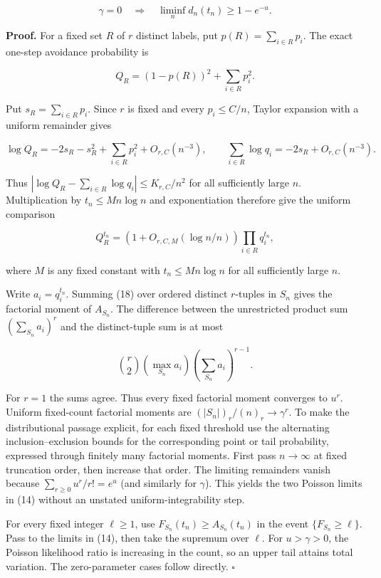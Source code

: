 \documentclass[
  british,
  11pt,
]{article}
\begin{document}
\[\gamma=0\quad\Longrightarrow\quad
\liminf_n d_n(t_n)\ge1-e^{-u}. \tag{16}\]

\textbf{Proof.} For a fixed set \(R\) of \(r\) distinct labels, put
\(p(R)=\sum_{i\in R}p_i\). The exact one-step avoidance probability is

\[Q_R=(1-p(R))^2+\sum_{i\in R}p_i^2. \tag{17}\]

Put \(s_R=\sum_{i\in R}p_i\). Since \(r\) is fixed and every
\(p_i\le C/n\), Taylor expansion with a uniform remainder gives

\[
\log Q_R=-2s_R-s_R^2+\sum_{i\in R}p_i^2+O_{r,C}(n^{-3}),
\qquad
\sum_{i\in R}\log q_i=-2s_R+O_{r,C}(n^{-3}).
\]

Thus \(|\log Q_R-\sum_{i\in R}\log q_i|\le K_{r,C}/n^2\) for all
sufficiently large \(n\). Multiplication by \(t_n\le Mn\log n\) and
exponentiation therefore give the uniform comparison

\[
Q_R^{t_n}=
\left(1+O_{r,C,M}(\log n/n)\right)\prod_{i\in R}q_i^{t_n}, \tag{18}
\]

where \(M\) is any fixed constant with \(t_n\le Mn\log n\) for all
sufficiently large \(n\).

Write \(a_i=q_i^{t_n}\). Summing (18) over ordered distinct \(r\)-tuples
in \(S_n\) gives the factorial moment of \(A_{S_n}\). The difference
between the unrestricted product sum \((\sum_{S_n}a_i)^r\) and the
distinct-tuple sum is at most

\[\binom r2\left(\max_{S_n}a_i\right)\left(\sum_{S_n}a_i\right)^{r-1}.\]

For \(r=1\) the sums agree. Thus every fixed factorial moment converges
to \(u^r\). Uniform fixed-count factorial moments are
\((|S_n|)_r/(n)_r\to\gamma^r\). To make the distributional passage
explicit, for each fixed threshold use the alternating
inclusion--exclusion bounds for the corresponding point or tail
probability, expressed through finitely many factorial moments. First
pass \(n\to\infty\) at fixed truncation order, then increase that order.
The limiting remainders vanish because \(\sum_{r\ge0}u^r/r!=e^u\) (and
similarly for \(\gamma\)). This yields the two Poisson limits in (14)
without an unstated uniform-integrability step.

For every fixed integer \(\ell\ge1\), use
\(F_{S_n}(t_n)\ge A_{S_n}(t_n)\) in the event \(\{F_{S_n}\ge\ell\}\).
Pass to the limits in (14), then take the supremum over \(\ell\). For
\(u>\gamma>0\), the Poisson likelihood ratio is increasing in the count,
so an upper tail attains total variation. The zero-parameter cases
follow directly. \(\square\)
\end{document}
